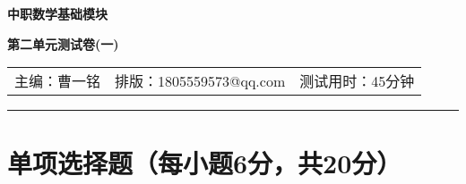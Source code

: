 \documentclass{ctexart}
\begin{document}
\begin{center}
\textbf{\LARGE 中职数学基础模块}\par
\vspace{8pt}
\textbf{\Large 第二单元测试卷(一)}
\end{center}

\begin{center}
\begin{tabular}{m{} m{} m{}}
     主编：曹一铭 &排版：1805559573@qq.com &测试用时：45分钟
\end{tabular}
\end{center}
\hrule height 1pt

\section{单项选择题（每小题6分，共20分）}
\end{document}
